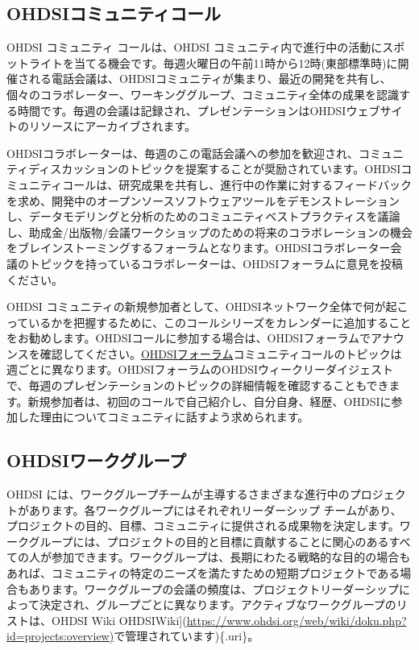 \documentclass[
  11pt]{book}
\theoremstyle{definition}
\theoremstyle{definition}
\theoremstyle{definition}
\theoremstyle{definition}
\theoremstyle{remark}
\begin{document}
\subsection{OHDSIコミュニティコール}\label{ohdsiux30b3ux30dfux30e5ux30cbux30c6ux30a3ux30b3ux30fcux30eb}

OHDSI コミュニティ コールは、OHDSI コミュニティ内で進行中の活動にスポットライトを当てる機会です。毎週火曜日の午前11時から12時(東部標準時)に開催される電話会議は、OHDSIコミュニティが集まり、最近の開発を共有し、個々のコラボレーター、ワーキンググループ、コミュニティ全体の成果を認識する時間です。毎週の会議は記録され、プレゼンテーションはOHDSIウェブサイトのリソースにアーカイブされます。

OHDSIコラボレーターは、毎週のこの電話会議への参加を歓迎され、コミュニティディスカッションのトピックを提案することが奨励されています。OHDSIコミュニティコールは、研究成果を共有し、進行中の作業に対するフィードバックを求め、開発中のオープンソースソフトウェアツールをデモンストレーションし、データモデリングと分析のためのコミュニティベストプラクティスを議論し、助成金/出版物/会議ワークショップのための将来のコラボレーションの機会をブレインストーミングするフォーラムとなります。OHDSIコラボレーター会議のトピックを持っているコラボレーターは、OHDSIフォーラムに意見を投稿ください。

OHDSI コミュニティの新規参加者として、OHDSIネットワーク全体で何が起こっているかを把握するために、このコールシリーズをカレンダーに追加することをお勧めします。OHDSIコールに参加する場合は、OHDSIフォーラムでアナウンスを確認してください。\href{https://forums.ohdsi.org/}{OHDSIフォーラム}コミュニティコールのトピックは週ごとに異なります。OHDSIフォーラムのOHDSIウィークリーダイジェストで、毎週のプレゼンテーションのトピックの詳細情報を確認することもできます。新規参加者は、初回のコールで自己紹介し、自分自身、経歴、OHDSIに参加した理由についてコミュニティに話すよう求められます。

\subsection{OHDSIワークグループ}\label{ohdsiux30efux30fcux30afux30b0ux30ebux30fcux30d7}

OHDSI には、ワークグループチームが主導するさまざまな進行中のプロジェクトがあります。各ワークグループにはそれぞれリーダーシップ チームがあり、プロジェクトの目的、目標、コミュニティに提供される成果物を決定します。ワークグループには、プロジェクトの目的と目標に貢献することに関心のあるすべての人が参加できます。ワークグループは、長期にわたる戦略的な目的の場合もあれば、コミュニティの特定のニーズを満たすための短期プロジェクトである場合もあります。ワークグループの会議の頻度は、プロジェクトリーダーシップによって決定され、グループごとに異なります。アクティブなワークグループのリストは、OHDSI Wiki OHDSIWiki{]}(\href{https://www.ohdsi.org/web/wiki/doku.php?id=projects:overview}{https://www.ohdsi.org/web/wiki/doku.php?id=projects:overview)}で管理されています)\{.uri\}。 
\end{document}
